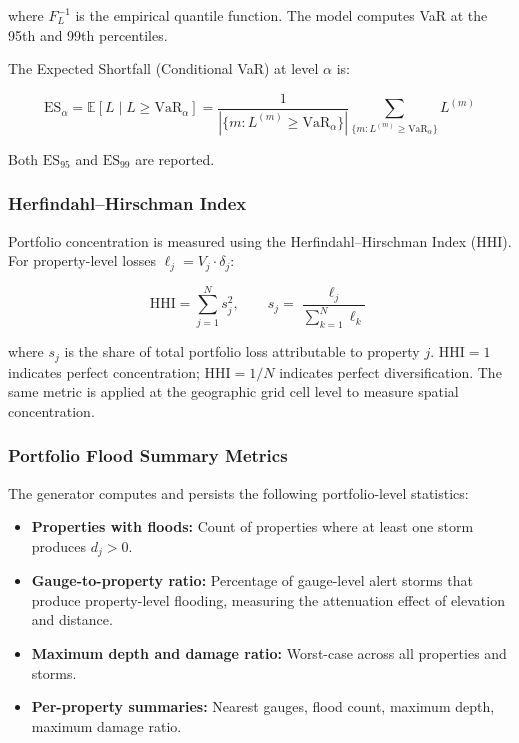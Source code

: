 \documentclass[11pt,a4paper]{article}
\begin{document}
\noindent where $F_L^{-1}$ is the empirical quantile function. The model computes
VaR at the 95th and 99th percentiles.

The Expected Shortfall (Conditional VaR) at level $\alpha$ is:

\begin{equation}
    \text{ES}_\alpha = \mathbb{E}\!\left[L \mid L \geq \text{VaR}_\alpha\right]
    = \frac{1}{|\{m : L^{(m)} \geq \text{VaR}_\alpha\}|}
    \sum_{\{m : L^{(m)} \geq \text{VaR}_\alpha\}} L^{(m)}
    \label{eq:es}
\end{equation}

\noindent Both $\text{ES}_{95}$ and $\text{ES}_{99}$ are reported.

\subsubsection{Herfindahl--Hirschman Index}

Portfolio concentration is measured using the Herfindahl--Hirschman Index (HHI). For
property-level losses $\ell_j = V_j \cdot \delta_j$:

\begin{equation}
    \text{HHI} = \sum_{j=1}^{N} s_j^2, \qquad
    s_j = \frac{\ell_j}{\sum_{k=1}^{N} \ell_k}
    \label{eq:hhi}
\end{equation}

\noindent where $s_j$ is the share of total portfolio loss attributable to
property $j$. $\text{HHI} = 1$ indicates perfect concentration;
$\text{HHI} = 1/N$ indicates perfect diversification. The same metric is applied
at the geographic grid cell level to measure spatial concentration.

\subsubsection{Portfolio Flood Summary Metrics}

The generator computes and persists the following portfolio-level statistics:

\begin{itemize}[nosep]
    \item \textbf{Properties with floods:} Count of properties where at least one
          storm produces $d_j > 0$.
    \item \textbf{Gauge-to-property ratio:} Percentage of gauge-level alert storms
          that produce property-level flooding, measuring the attenuation effect of
          elevation and distance.
    \item \textbf{Maximum depth and damage ratio:} Worst-case across all properties
          and storms.
    \item \textbf{Per-property summaries:} Nearest gauges, flood count, maximum
          depth, maximum damage ratio.
\end{itemize}
\end{document}
